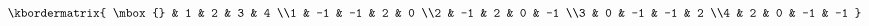 \documentclass[10pt]{article}
\begin{document}
\[\kbordermatrix{
  \mbox{} & 1 & 2 & 3 & 4
  \\1 & -1 & -1 & 2 & 0
  \\2 & -1 & 2 & 0 & -1
  \\3 & 0 & -1 & -1 & 2
  \\4 & 2 & 0 & -1 & -1
}
\]
\end{document}
